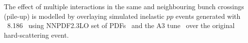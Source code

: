 The effect of multiple interactions in the same and neighbouring bunch
crossings (pile-up) is modelled by overlaying simulated inelastic $pp$
events generated with \pythia~8.186~\cite{Sjostrand:2014zea}
using NNPDF2.3LO set of PDFs~\cite{Ball:2012cx} and the A3
tune~\cite{ATL-PHYS-PUB-2016-017} over the original hard-scattering event. 
%
%
%
%
